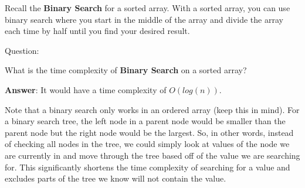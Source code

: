 \documentclass[11pt,a4paper,english]{paper}
\begin{document}
Recall the \textbf{Binary Search} for a sorted array. With a sorted array, you can use binary search where you start in the middle of the array and divide the array each time by half until you find your desired result.

\bigskip
\begin{gbox}{Question:} {

    What is the time complexity of \textbf{Binary Search} on a sorted array?

    \bigskip
    \textbf{Answer}: It would have a time complexity of $O(log(n))$.

}\end{gbox}

\bigskip

Note that a binary search only works in an ordered array (keep this in mind). For a binary search tree, the left node in a parent node would be smaller than the parent node but the right node would be the largest. So, in other words, instead of checking all nodes in the tree, we could simply look at values of the node we are currently in and move through the tree based off of the value we are searching for. This significantly shortens the time complexity of searching for a value and excludes parts of the tree we know will not contain the value.
\end{document}
